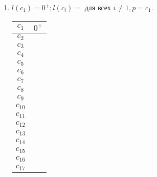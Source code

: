 \documentclass[12pt, a4paper] {ncc}
\begin{document}
\begin{enumerate}
    \item $l(c_1) = 0^+; l(c_i) =$ \z  для всех $ i \neq 1, p = c_1$. 

\begin{tabular} {|c|c|}
    \hline
    $c_{1}$  &$0^+$\\ \hline
    $c_{2}$  & \z  \\ \hline
    $c_{3}$  & \z  \\ \hline
    $c_{4}$  & \z  \\ \hline
    $c_{5}$  & \z  \\ \hline
    $c_{6}$  & \z  \\ \hline
    $c_{7}$  & \z  \\ \hline
    $c_{8}$  & \z  \\ \hline
    $c_{9}$  & \z  \\ \hline
    $c_{10}$ & \z  \\ \hline
    $c_{11}$ & \z  \\ \hline
    $c_{12}$ & \z  \\ \hline
    $c_{13}$ & \z  \\ \hline
    $c_{14}$ & \z  \\ \hline
    $c_{15}$ & \z  \\ \hline
    $c_{16}$ & \z  \\ \hline
    $c_{17}$ & \z  \\ \hline 
\end{tabular}


\end{enumerate}
\end{document}

